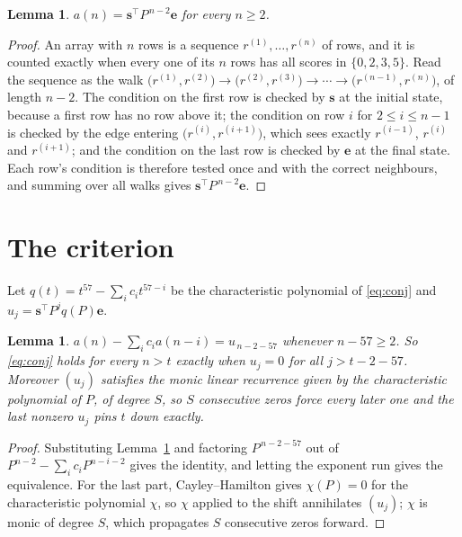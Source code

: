 \documentclass[11pt,a4paper]{article}
\theoremstyle{plain}
\newtheorem{lemma}[theorem]{Lemma}
\theoremstyle{definition}
\begin{document}
\begin{lemma}\label{lem:walk}
$a(n)=\mathbf{s}^{\!\top}P^{\,n-2}\mathbf{e}$ for every $n\ge2$.
\end{lemma}

\begin{proof}
An array with $n$ rows is a sequence $r^{(1)},\dots,r^{(n)}$ of rows, and it is counted
exactly when every one of its $n$ rows has all scores in $\{0,2,3,5\}$. Read the sequence as the
walk $\bigl(r^{(1)},r^{(2)}\bigr)\to\bigl(r^{(2)},r^{(3)}\bigr)\to\cdots\to
\bigl(r^{(n-1)},r^{(n)}\bigr)$, of length $n-2$. The condition on the first row is
checked by $\mathbf{s}$ at the initial state, because a first row has no row above it; the
condition on row $i$ for $2\le i\le n-1$ is checked by the edge entering
$\bigl(r^{(i)},r^{(i+1)}\bigr)$, which sees exactly $r^{(i-1)}$, $r^{(i)}$ and
$r^{(i+1)}$; and the condition on the last row is checked by $\mathbf{e}$ at the final
state. Each row's condition is therefore tested once and with the correct neighbours, and
summing over all walks gives $\mathbf{s}^{\!\top}P^{\,n-2}\mathbf{e}$.
\end{proof}

\section{The criterion}

Let $q(t)=t^{57}-\sum_i c_i t^{57-i}$ be the characteristic polynomial of
\eqref{eq:conj} and $u_j=\mathbf{s}^{\!\top}P^{j}q(P)\mathbf{e}$.

\begin{lemma}\label{lem:crit}
$a(n)-\sum_i c_i a(n-i)=u_{\,n-2-57}$ whenever $n-57\ge2$. So \eqref{eq:conj}
holds for every $n>t$ exactly when $u_j=0$ for all $j>t-2-57$. Moreover $(u_j)$
satisfies the monic linear recurrence given by the characteristic polynomial of $P$, of
degree $S$, so $S$ consecutive zeros force every later one and the last nonzero $u_j$ pins
$t$ down exactly.
\end{lemma}

\begin{proof}
Substituting Lemma~\ref{lem:walk} and factoring $P^{\,n-2-57}$ out of
$P^{n-2}-\sum_i c_i P^{n-i-2}$ gives the identity, and letting the exponent run gives the
equivalence. For the last part, Cayley--Hamilton gives $\chi(P)=0$ for the characteristic
polynomial $\chi$, so $\chi$ applied to the shift annihilates $(u_j)$; $\chi$ is monic of
degree $S$, which propagates $S$ consecutive zeros forward.
\end{proof}
\end{document}

